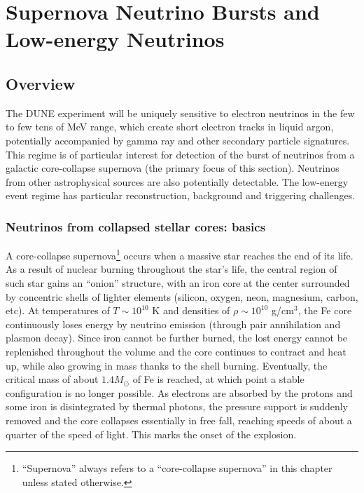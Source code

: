 
\chapter{Supernova Neutrino Bursts and Low-energy Neutrinos}
\label{ch:physics-snblowe}

\section{Overview}
\label{sec:physics-snblowe-overview}

The DUNE experiment will be uniquely sensitive to electron neutrinos in the few to few
tens of MeV range, which create short electron tracks in liquid argon, potentially accompanied by
gamma ray and other secondary particle signatures.  This regime is of
particular interest for detection of the burst of neutrinos from a galactic
core-collapse supernova (the primary focus of this section). 
Neutrinos from other astrophysical sources are also potentially detectable.
The low-energy event regime has particular reconstruction, background and triggering challenges.

\subsection{Neutrinos from collapsed stellar cores: basics}

A core-collapse supernova\footnote{``Supernova'' always
  refers to a ``core-collapse supernova'' in this chapter unless
  stated otherwise.} occurs when a massive star reaches the end of its
life. As a result of nuclear burning throughout the star's life, the central region of such star gains an ``onion'' structure, with an iron core at the center surrounded by concentric shells of lighter elements (silicon, oxygen, neon, magnesium, carbon, etc). At temperatures of $T\sim 10^{10}$ K and densities of $\rho \sim 10^{10}$ g/cm$^{3}$, the Fe core continuously loses energy by neutrino emission (through pair annihilation and plasmon decay). Since iron cannot be further burned, the lost energy cannot be replenished throughout the volume and the core continues to contract and heat up, while also growing in mass thanks to the shell burning. Eventually, the critical mass of about $1.4 M_{\odot}$ of Fe is reached, at which point a stable configuration is no longer possible. As electrons are absorbed by the protons and some iron is disintegrated by thermal photons, the pressure support is suddenly removed and the core collapses essentially in free fall, reaching speeds of about a quarter of the speed of light. This marks the onset of the explosion.


